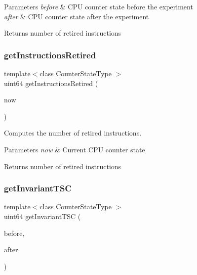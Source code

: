 \begin{DoxyParams}{Parameters}
{\em before} & C\+PU counter state before the experiment \\
\hline
{\em after} & C\+PU counter state after the experiment \\
\hline
\end{DoxyParams}
\begin{DoxyReturn}{Returns}
number of retired instructions 
\end{DoxyReturn}
\mbox{\label{classBasicCounterState_afced47e4bb3712da79dc64cb16ac335a}} 
\subsubsection{get\+Instructions\+Retired\hspace{0.1cm}{\footnotesize\ttfamily [2/2]}}
{\footnotesize\ttfamily template$<$class Counter\+State\+Type $>$ \\
uint64 get\+Instructions\+Retired (\begin{DoxyParamCaption}\item[{const Counter\+State\+Type \&}]{now }\end{DoxyParamCaption})\hspace{0.3cm}{\ttfamily [friend]}}



Computes the number of retired instructions. 


\begin{DoxyParams}{Parameters}
{\em now} & Current C\+PU counter state \\
\hline
\end{DoxyParams}
\begin{DoxyReturn}{Returns}
number of retired instructions 
\end{DoxyReturn}
\mbox{\label{classBasicCounterState_a45cf07a8d3ce2c48968842554a3854f9}} 
\subsubsection{get\+Invariant\+T\+SC}
{\footnotesize\ttfamily template$<$class Counter\+State\+Type $>$ \\
uint64 get\+Invariant\+T\+SC (\begin{DoxyParamCaption}\item[{const Counter\+State\+Type \&}]{before,  }\item[{const Counter\+State\+Type \&}]{after }\end{DoxyParamCaption})\hspace{0.3cm}{\ttfamily [friend]}}



